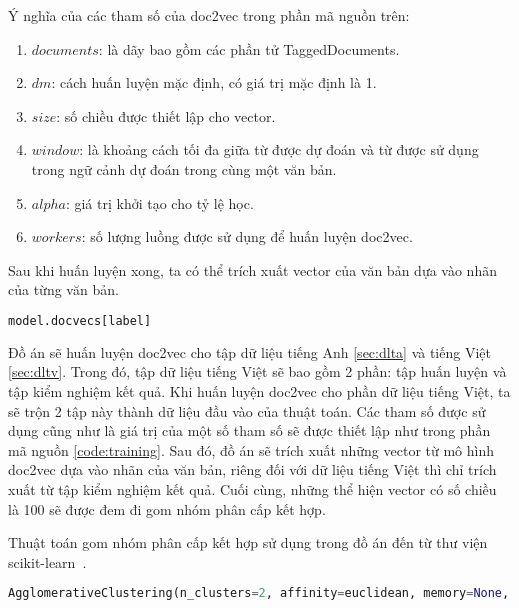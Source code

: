 Ý nghĩa của các tham số của doc2vec trong phần mã nguồn trên:
\begin{enumerate}
\item[•]$documents$: là dãy bao gồm các phần tử TaggedDocuments.
\item[•]$dm$: cách huấn luyện mặc định, có giá trị mặc định là 1.
\item[•]$size$: số chiều được thiết lập cho vector.
\item[•]$window$: là khoảng cách tối đa giữa từ được dự đoán và từ được sử dụng trong ngữ cảnh dự đoán trong cùng một văn bản.
\item[•]$alpha$: giá trị khởi tạo cho tỷ lệ học.
\item[•]$workers$:  số lượng luồng được sử dụng để huấn luyện doc2vec.
\end{enumerate}

Sau khi huấn luyện xong, ta có thể trích xuất vector của văn bản dựa vào nhãn của từng văn bản.
\begin{lstlisting}[language=Python]
model.docvecs[label]
\end{lstlisting}

Đồ án sẽ huấn luyện doc2vec cho tập dữ liệu tiếng Anh \ref{sec:dlta} và tiếng Việt \ref{sec:dltv}.
Trong đó, tập dữ liệu tiếng Việt sẽ bao gồm 2 phần: tập huấn luyện và tập kiểm nghiệm kết quả.
Khi huấn luyện doc2vec cho phần dữ liệu tiếng Việt, ta sẽ trộn 2 tập này thành dữ liệu đầu vào của thuật toán.
Các tham số được sử dụng cũng như là giá trị của một số tham số sẽ được thiết lập như trong phần mã nguồn \ref{code:training}.
Sau đó, đồ án sẽ trích xuất những vector từ mô hình doc2vec dựa vào nhãn của văn bản, riêng đối với dữ liệu tiếng Việt thì chỉ trích xuất từ tập kiểm nghiệm kết quả.
Cuối cùng, những thể hiện vector có số chiều là 100 sẽ được đem đi gom nhóm phân cấp kết hợp.

Thuật toán gom nhóm phân cấp kết hợp sử dụng trong đồ án đến từ thư viện scikit-learn~\cite{hac-scikit}.

\begin{lstlisting}[language=Python]
AgglomerativeClustering(n_clusters=2, affinity=euclidean, memory=None, connectivity=None, compute_full_tree=auto, linkage=ward, pooling_func=<function mean>)
\end{lstlisting}
\label{ahc-scikit}

